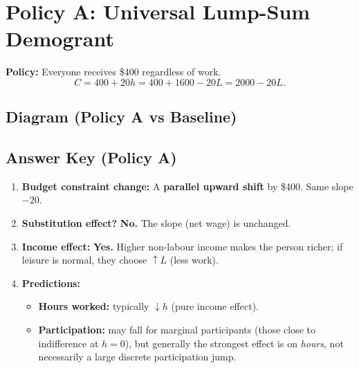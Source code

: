 \documentclass[12pt]{article}
\begin{document}
\newpage

\section*{Policy A: Universal Lump-Sum Demogrant}

\textbf{Policy:} Everyone receives \$400 regardless of work.
\[
C = 400 + 20h = 400 + 1600 - 20L = 2000 - 20L.
\]

\subsection*{Diagram (Policy A vs Baseline)}

\begin{center}
\end{center}

\subsection*{Answer Key (Policy A)}

\begin{enumerate}
\item \textbf{Budget constraint change:} A \textbf{parallel upward shift} by \$400. Same slope \(-20\).
\item \textbf{Substitution effect?} \textbf{No.} The slope (net wage) is unchanged.
\item \textbf{Income effect:} \textbf{Yes.} Higher non-labour income makes the person richer; if leisure is normal, they choose \(\uparrow L\) (less work).
\item \textbf{Predictions:}
\begin{itemize}
\item \textbf{Hours worked:} typically \(\downarrow h\) (pure income effect).
\item \textbf{Participation:} may fall for marginal participants (those close to indifference at \(h=0\)), but generally the strongest effect is on \emph{hours}, not necessarily a large discrete participation jump.
\end{itemize}
\end{enumerate}
\end{document}
